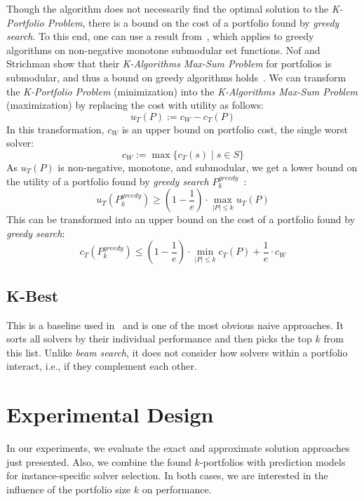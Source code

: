 \documentclass[a4paper,USenglish,pdfa]{lipics-v2021} %
\begin{document}
Though the algorithm does not necessarily find the optimal solution to the \emph{K-Portfolio Problem}, there is a bound on the cost of a portfolio found by \emph{greedy search}. 
To this end, one can use a result from~\cite{nemhauser1978analysis}, which applies to greedy algorithms on non-negative monotone submodular set functions.
Nof and Strichman show that their \emph{K-Algorithms Max-Sum Problem} for portfolios is submodular, and thus a bound on greedy algorithms holds~\cite{nof2020real}. 
We can transform the \emph{K-Portfolio Problem} (minimization) into the \emph{K-Algorithms Max-Sum Problem} (maximization) by replacing the cost with utility as follows:%
\[
u_{T}(P) := c_W - c_{T}(P)
\]
In this transformation, $c_W$ is an upper bound on portfolio cost, the single worst solver:%
\[
c_W := \max\{c_T(s) \mid s \in S\}
\]
As $u_{T}(P)$ is non-negative, monotone, and submodular, we get a lower bound on the utility of a portfolio found by \emph{greedy search} $P_k^{greedy}$~\cite{nemhauser1978analysis,krause2014submodular}:%
\[
	u_{T}(P_k^{greedy}) \geq (1 - \frac{1}{e}) \cdot \max_{|P| \leq k}{u_{T}(P)}
\]
This can be transformed into an upper bound on the cost of a portfolio found by \emph{greedy search}:%
\begin{equation}
	c_{T}(P_k^{greedy}) \leq (1 - \frac{1}{e}) \cdot \min_{|P| \leq k}{c_{T}(P)} + \frac{1}{e} \cdot c_W
	\label{eq:upper-bound}
\end{equation}

\subsection{K-Best}
\label{sec:approach:k-best}

This is a baseline used in~\cite{nof2020real} and is one of the most obvious naive approaches. 
It sorts all solvers by their individual performance and then picks the top $k$ from this list.
Unlike \emph{beam search}, it does not consider how solvers within a portfolio interact, i.e., if they complement each other.

\section{Experimental Design}
\label{sec:experimental-design}

In our experiments, we evaluate the exact and approximate solution approaches just presented.
Also, we combine the found $k$-portfolios with prediction models for instance-specific solver selection. 
In both cases, we are interested in the influence of the portfolio size $k$ on performance. 
\end{document}
